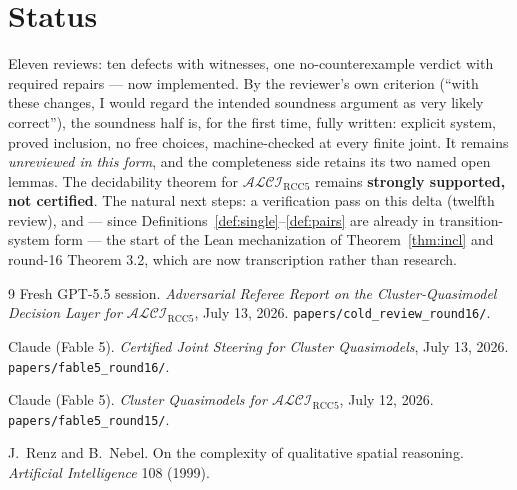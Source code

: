 \documentclass[11pt]{article}
\theoremstyle{definition}
\newcommand{\ALCIRCC}{\mathcal{ALCI}_{\mathrm{RCC5}}}
\newcommand{\code}[1]{\texttt{#1}}
\begin{document}
\section{Status}

Eleven reviews: ten defects with witnesses, one no-counterexample
verdict with required repairs --- now implemented.  By the reviewer's
own criterion (``with these changes, I would regard the intended
soundness argument as very likely correct''), the soundness half is,
for the first time, fully written: explicit system, proved inclusion,
no free choices, machine-checked at every finite joint.  It remains
\emph{unreviewed in this form}, and the completeness side retains its
two named open lemmas.  The decidability theorem for $\ALCIRCC$
remains \textbf{strongly supported, not certified}.  The natural next
steps: a verification pass on this delta (twelfth review), and --- since
Definitions~\ref{def:single}--\ref{def:pairs} are already in
transition-system form --- the start of the Lean mechanization of
Theorem~\ref{thm:incl} and round-16 Theorem 3.2, which are now
transcription rather than research.

\begin{thebibliography}{9}
 Fresh GPT-5.5 session.  \emph{Adversarial Referee
Report on the Cluster-Quasimodel Decision Layer for
$\mathcal{ALCI}_{\mathrm{RCC5}}$}, July 13, 2026.
\code{papers/cold\_review\_round16/}.

 Claude (Fable 5).  \emph{Certified Joint Steering for
Cluster Quasimodels}, July 13, 2026.  \code{papers/fable5\_round16/}.

 Claude (Fable 5).  \emph{Cluster Quasimodels for
$\mathcal{ALCI}_{\mathrm{RCC5}}$}, July 12, 2026.
\code{papers/fable5\_round15/}.

 J.~Renz and B.~Nebel.  On the complexity of
qualitative spatial reasoning.  \emph{Artificial Intelligence} 108
(1999).
\end{thebibliography}
\end{document}
